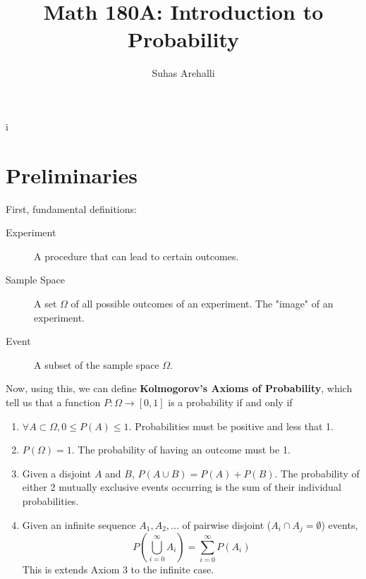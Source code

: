 i\documentclass[10pt]{article}
\title{Math 180A: Introduction to Probability}
\author{Suhas Arehalli}
\begin{document}
\maketitle
\newcommand{\indefint}{\int_{-\infty}^{\infty}}

\section{Preliminaries}

First, fundamental definitions:
\begin{description}
    \item[Experiment] A procedure that can lead to certain outcomes.
    \item[Sample Space] A set $\Omega$ of all possible outcomes of an
    experiment. The "image" of an experiment.
    \item[Event] A subset of the sample space $\Omega$. 
\end{description}

Now, using this, we can define \textbf{Kolmogorov's Axioms of Probability}, which tell us that a function 
$ P: \Omega \rightarrow [0, 1] $ is a probability if and only if 
\begin{enumerate}
    \item $\forall A \subset \Omega, 0 \leq P(A) \leq 1$. Probabilities must be positive and less that 1.
    \item $P(\Omega) = 1$. The probability of having an outcome must be 1.
    \item Given a disjoint $A$ and $B$, $P(A \cup B) = P(A) + P(B)$. The
        probability of either 2 mutually exclusive events occurring is the sum of
        their individual probabilities. 
    \item Given an infinite sequence $A_1, A_2, ...$ of pairwise disjoint ($A_i \cap A_j = \emptyset $) events, 
             \[P\left(\bigcup_{i = 0}^{\infty} A_i\right) =  \sum_{i =0}^{\infty} P(A_i) \] 
         This is extends Axiom 3 to the infinite case.
\end{enumerate}
\end{document}
